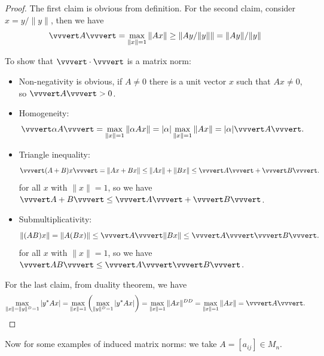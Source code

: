 \documentclass[../main.tex]{subfiles}
\begin{document}
\begin{proof}
  The first claim is obvious from definition. For the second claim, consider $x = y / \|y\|$, then we have
  \begin{equation*}
    \vvvert A \vvvert = \max_{\|x\| = 1} \|A x\| \geq \|A y / \|y\|\| = \|A y\| / \|y\|
  \end{equation*}

  To show that $\vvvert \cdot \vvvert$ is a matrix norm:
  \begin{itemize}
    \item Non-negativity is obvious, if $A \neq 0$ there is a unit vector $x$ such that $A x \neq 0$, so $\vvvert A \vvvert > 0$.
    \item Homogeneity:
      \begin{equation*}
        \vvvert \alpha A \vvvert = \max_{\|x\| = 1} \|\alpha A x\| = |\alpha| \max_{\|x\| = 1} \|A x\| = |\alpha| \vvvert A \vvvert.
      \end{equation*}
    \item Triangle inequality:
      \begin{equation*}
        \vvvert (A + B) x\vvvert = \|Ax + Bx\| \leq \|A x\| + \|B x\| \leq \vvvert A \vvvert + \vvvert B \vvvert.
      \end{equation*}
      for all $x$ with $\|x\| = 1$, so we have $\vvvert A + B \vvvert \leq \vvvert A \vvvert + \vvvert B \vvvert$.
    \item Submultiplicativity:
      \begin{equation*}
        \|(AB)x\| = \|A(B x)\| \leq \vvvert A \vvvert \|B x\| \leq \vvvert A \vvvert \vvvert B \vvvert.
      \end{equation*}
      for all $x$ with $\|x\| = 1$, so we have $\vvvert AB \vvvert \leq \vvvert A \vvvert \vvvert B \vvvert$.
  \end{itemize}

  For the last claim, from duality theorem, we have
  \begin{equation*}
    \max_{\|x\| = \|y\|^D = 1} |y^* A x| = \max_{\|x\| = 1} \left( \max_{\|y\|^D = 1} |y^* A x| \right) = \max_{\|x\| = 1} \|A x\|^{DD} = \max_{\|x\| = 1} \|A x\| = \vvvert A \vvvert.
  \end{equation*}
\end{proof}


Now for some examples of induced matrix norms: we take $A = [a_{ij}]\in M_n$.
\end{document}

